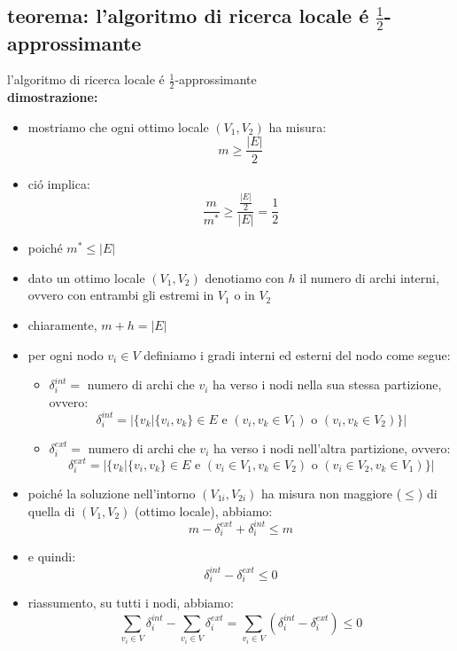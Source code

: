 \subsection*{teorema: l'algoritmo di ricerca locale \'e $\frac{1}{2}$-approssimante}
\begin{flushleft}
	l'algoritmo di ricerca locale \'e $\frac{1}{2}$-approssimante \newline \\
	\vspace{0.5cm}
	\textbf{dimostrazione:}
	\begin{itemize}
		\item mostriamo che ogni ottimo locale $(V_1,V_2)$ ha misura:
			$$m\geq\frac{\vert E\vert}{2}$$
		\item ci\'o implica:
			$$\frac{m}{m^*}\geq\frac{\frac{\vert E\vert}{2}}{\vert E\vert}=\frac{1}{2}$$
		\vspace{0.5cm}
		\item poich\'e $m^*\leq\vert E\vert$
		\item dato un ottimo locale $(V_1,V_2)$ denotiamo con $h$ il numero di archi interni, ovvero con entrambi gli estremi in $V_1$ o in $V_2$
		\item chiaramente, $m+h=\vert E\vert$
		\item per ogni nodo $v_i\in V$ definiamo i gradi interni ed esterni del nodo come segue:
		\begin{itemize}
			\item $\delta_i^{int}=$ numero di archi che $v_i$ ha verso i nodi nella sua stessa partizione, ovvero:
				$$\delta_i^{int}=\vert\{v_k\vert\{v_i,v_k\}\in E\text{ e }(v_i,v_k\in V_1)\text{ o }(v_i,v_k\in V_2)\}\vert$$
			\item $\delta_i^{ext}=$ numero di archi che $v_i$ ha verso i nodi nell'altra partizione, ovvero:
				$$\delta_i^{ext}=\vert\{v_k\vert\{v_i,v_k\}\in E\text{ e }(v_i\in V_1,v_k\in V_2)\text{ o }(v_i\in V_2,v_k\in V_1)\}\vert$$
		\end{itemize}
		\item poich\'e la soluzione nell'intorno $(V_{1i},V_{2i})$ ha misura non maggiore ($\leq$) di quella di $(V_1,V_2)$ (ottimo locale), abbiamo:
			$$m-\delta_i^{ext}+\delta_i^{int}\leq m$$
		\item e quindi:
			$$\delta_i^{int}-\delta_i^{ext}\leq 0$$
		\item riassumento, su tutti i nodi, abbiamo:
			$$\sum_{v_i\in V}\delta_i^{int}-\sum_{v_i\in V}\delta_i^{ext}=\sum_{v_i\in V}(\delta_i^{int}-\delta_i^{ext})\leq 0$$

\end{itemize}
\end{flushleft}
